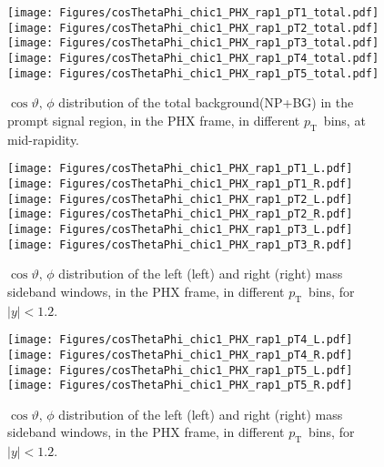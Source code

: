 \documentclass[12pt]{article}
\newcommand{\pt}{$p_{\mathrm{T}}$}
\begin{document}


\begin{figure}[htbp]
\centering
\texttt{[image: Figures/cosThetaPhi\_chic1\_PHX\_rap1\_pT1\_total.pdf]}
\texttt{[image: Figures/cosThetaPhi\_chic1\_PHX\_rap1\_pT2\_total.pdf]}
\texttt{[image: Figures/cosThetaPhi\_chic1\_PHX\_rap1\_pT3\_total.pdf]}
\texttt{[image: Figures/cosThetaPhi\_chic1\_PHX\_rap1\_pT4\_total.pdf]}
\texttt{[image: Figures/cosThetaPhi\_chic1\_PHX\_rap1\_pT5\_total.pdf]}
\caption{$\cos\vartheta,\,\phi$ distribution of the total
  background(NP+BG) in the prompt signal region,
        in the PHX frame, in different \pt\ bins, at mid-rapidity.}
\end{figure}
\clearpage


\begin{figure}[htbp]
\centering
\texttt{[image: Figures/cosThetaPhi\_chic1\_PHX\_rap1\_pT1\_L.pdf]}
\texttt{[image: Figures/cosThetaPhi\_chic1\_PHX\_rap1\_pT1\_R.pdf]}
\texttt{[image: Figures/cosThetaPhi\_chic1\_PHX\_rap1\_pT2\_L.pdf]}
\texttt{[image: Figures/cosThetaPhi\_chic1\_PHX\_rap1\_pT2\_R.pdf]}
\texttt{[image: Figures/cosThetaPhi\_chic1\_PHX\_rap1\_pT3\_L.pdf]}
\texttt{[image: Figures/cosThetaPhi\_chic1\_PHX\_rap1\_pT3\_R.pdf]}
\caption{$\cos\vartheta,\,\phi$ distribution of the left (left) and
  right (right) mass sideband windows, in the PHX frame, in different
  \pt\ bins, for $|y| < 1.2$.}
\end{figure}
\clearpage

\begin{figure}[htbp]
\centering
\texttt{[image: Figures/cosThetaPhi\_chic1\_PHX\_rap1\_pT4\_L.pdf]}
\texttt{[image: Figures/cosThetaPhi\_chic1\_PHX\_rap1\_pT4\_R.pdf]}
\texttt{[image: Figures/cosThetaPhi\_chic1\_PHX\_rap1\_pT5\_L.pdf]}
\texttt{[image: Figures/cosThetaPhi\_chic1\_PHX\_rap1\_pT5\_R.pdf]}
\caption{$\cos\vartheta,\,\phi$ distribution of the left (left) and
  right (right) mass sideband windows, in the PHX frame, in different
  \pt\ bins, for $|y| < 1.2$.}
\end{figure}
\clearpage
\end{document}
